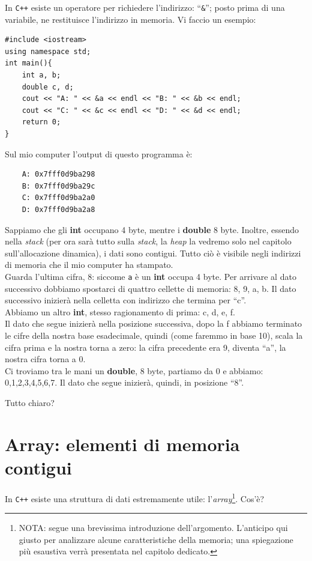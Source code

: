 	In \verb|C++| esiste un operatore per richiedere l'indirizzo: ``\verb|&|''; posto prima di una variabile, ne restituisce l'indirizzo in memoria. Vi faccio un esempio:
	\begin{lstlisting}
#include <iostream>
using namespace std;
int main(){
	int a, b;
	double c, d;
	cout << "A: " << &a << endl << "B: " << &b << endl;
	cout << "C: " << &c << endl << "D: " << &d << endl;
	return 0;
}
	\end{lstlisting}
	Sul mio computer l'output di questo programma è:
	
		\begin{shaded}
			\begin{verbatim}
	A: 0x7fff0d9ba298
	B: 0x7fff0d9ba29c
	C: 0x7fff0d9ba2a0
	D: 0x7fff0d9ba2a8
		\end{verbatim}
	\end{shaded}
	Sappiamo che gli \textbf{int} occupano 4 byte,  mentre i \textbf{double} 8 byte. Inoltre, essendo nella \emph{stack} (per ora sarà tutto sulla \emph{stack}, la \emph{heap} la vedremo solo nel capitolo sull'allocazione dinamica), i dati sono contigui. Tutto ciò è visibile negli indirizzi di memoria che il mio computer ha stampato. \\
	Guarda l'ultima cifra, 8: siccome \verb|a| è un \textbf{int} occupa 4 byte. Per arrivare al dato successivo dobbiamo spostarci di quattro cellette di memoria:  8, 9, a, b. Il dato successivo inizierà nella celletta con indirizzo che termina per ``c''. 
	\\Abbiamo un altro \textbf{int}, stesso ragionamento di prima: c, d, e, f. 
	\\Il dato che segue inizierà nella posizione successiva, dopo la f abbiamo terminato le cifre della nostra base esadecimale, quindi (come faremmo in base 10), scala la cifra prima e la nostra torna a zero: la cifra precedente era 9, diventa ``a'', la nostra cifra torna a 0.\\
	Ci troviamo tra le mani un \textbf{double}, 8 byte, partiamo da 0 e abbiamo: 0,1,2,3,4,5,6,7. Il dato che segue inizierà, quindi, in posizione ``8''. 
	
	Tutto chiaro?
	\section{Array: elementi di memoria contigui}
	In \verb|C++| esiste una struttura di dati estremamente utile: l'\emph{array}\footnote{NOTA: segue una brevissima introduzione dell'argomento. L'anticipo qui giusto per analizzare alcune caratteristiche della memoria; una spiegazione più esaustiva verrà presentata nel capitolo dedicato.}. Cos'è?
	
